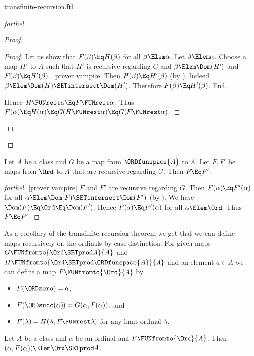 \documentclass{stex}
\begin{document}
\begin{smodule}{transfinite-recursion.ftl}
\begin{proof}[forthel]
\begin{proof}
\begin{proof}
      Let us show that $F(\beta) \Eq H(\beta)$ for all $\beta \Elem \alpha$.
        Let $\beta \Elem \alpha$.
        Choose a map $H'$ to $A$ such that $H'$ is recursive regarding $G$ and $\beta \Elem \Dom(H')$ and $F(\beta) \Eq H'(\beta)$.
        [prover vampire]
        Then $H(\beta) \Eq H'(\beta)$ (by ).
        Indeed $\beta \Elem \Dom(H) \SETintersect \Dom(H')$.
        Therefore $F(\beta) \Eq H'(\beta)$.
      End.

      Hence $H \FUNrest \alpha \Eq F \FUNrest \alpha$.
      Thus $F(\alpha)
        \Eq H(\alpha)
        \Eq G(H \FUNrest \alpha)
        \Eq G(F \FUNrest \alpha)$.
    \end{proof}
  \end{proof}
\end{proof}

\begin{theorem}[forthel,title=Transfinite Recursion Theorem: Uniqueness,id=transfinite_recursion_uniqueness]
  Let $A$ be a class and $G$ be a map from $\ORDfunspace{A}$ to $A$.
  Let $F, F'$ be maps from $\Ord$ to $A$ that are recursive regarding $G$.
  Then $F \Eq F'$.
\end{theorem}
\begin{proof}[forthel]
  [prover vampire]
  $F$ and $F'$ are recursive regarding $G$.
  Then $F(\alpha) \Eq F'(\alpha)$ for all $\alpha \Elem \Dom(F) \SETintersect \Dom(F')$ (by ).
  We have $\Dom(F) \Eq \Ord \Eq \Dom(F')$.
  Hence $F(\alpha) \Eq F'(\alpha)$ for all $\alpha \Elem \Ord$.
  Thus $F \Eq F'$.
\end{proof}

As a corollary of the transfinite recursion theorem we get that we can
define maps recursively on the ordinals by case distinction:
For given maps $G \FUNfromto{\Ord \SETprod A}{A}$ and
$H \FUNfromto{\Ord \SETprod \ORDfunspace{A}}{A}$ and an element $a \in A$ we
can define a map $F \FUNfromto{\Ord}{A}$ by
\begin{itemize}
  \item $F(\ORDzero) = a$,
  \item $F(\ORDsucc(\alpha)) = G(\alpha, F(\alpha))$, and
  \item $F(\lambda) = H(\lambda, F \FUNrest \lambda)$
    for any limit ordinal $\lambda$.
\end{itemize}

\begin{lemma}[forthel,id=transfinite_recursion_029348573987483]
  Let $A$ be a class and $\alpha$ be an ordinal and $F \FUNfromto{\Ord}{A}$.
  Then $(\alpha, F(\alpha)) \Elem \Ord \SETprod A$.
\end{lemma}


\end{smodule}
\end{document}
